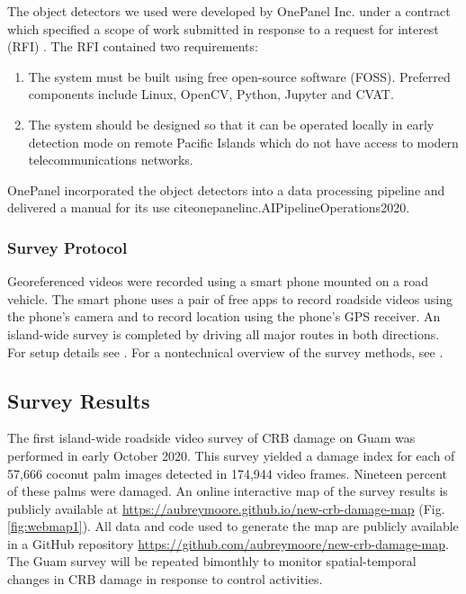 \documentclass[12pt,letterpaper,english,bibliography=totocnumbered,abstract=on]{scrartcl}
\begin{document}
The object detectors we used were developed by OnePanel Inc. under a contract which specified a scope of work \cite{onepanelinc.ScopeWorkObject2020} submitted in response to a request for interest (RFI) \cite{mooreRequestInterestObject2020}. The RFI contained two requirements:
\begin{enumerate}
	\item The system must be built using free open-source software (FOSS). Preferred components include Linux, OpenCV, Python, Jupyter and CVAT.
	\item The system should be designed so that it can be operated locally in early detection
	mode on remote Pacific Islands which do not have access to modern telecommunications networks.
\end{enumerate}
OnePanel incorporated the object detectors into a data processing pipeline and delivered a manual for its use cite{onepanelinc.AIPipelineOperations2020}.

\subsubsection{Survey Protocol}

Georeferenced videos were recorded using a smart phone mounted on a road vehicle. The smart phone uses a pair of free apps to record roadside videos using the phone's camera and to record location using the phone's GPS receiver. An island-wide survey is completed by driving all major routes in both directions.  For setup details see \cite{aubreymooreSetAutomatedRoadside2020}. For a nontechnical overview of the survey methods, see \cite{mooreUsingCellPhone2020}. 

\subsection{Survey Results}


The first island-wide roadside video survey of CRB damage on Guam was performed in early October 2020.  This survey yielded a damage index for each of 57,666 coconut palm images detected in 174,944 video frames. Nineteen percent of these palms were damaged. An online interactive map of the survey results is publicly available at \url{https://aubreymoore.github.io/new-crb-damage-map} (Fig. \ref{fig:webmap1}). All data and code used to generate the map are publicly available in a GitHub repository \url{https://github.com/aubreymoore/new-crb-damage-map}. The Guam survey will be repeated bimonthly to monitor spatial-temporal changes in CRB damage in response to control activities.
\end{document}
